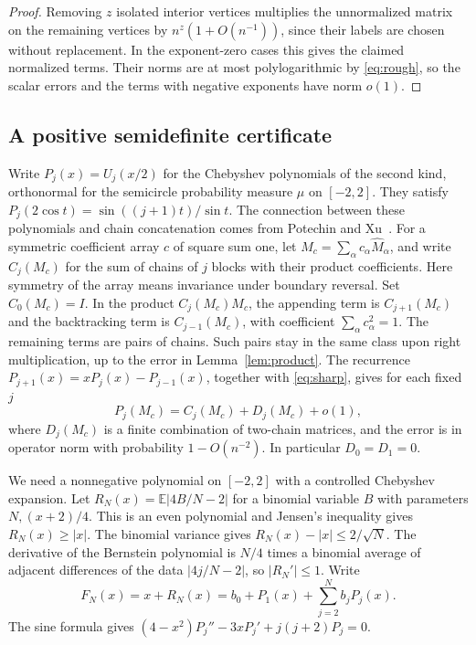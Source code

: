 \documentclass[preprints,article,submit,oneauthor]{Definitions/mdpi}
\newcommand{\E}{\mathbb E}
\newcommand{\abs}[1]{\lvert #1\rvert}
\begin{document}
\begin{proof}
Removing \(z\) isolated interior vertices multiplies the unnormalized
matrix on the remaining vertices by \(n^z(1+O(n^{-1}))\), since their
labels are chosen without replacement. In the exponent-zero cases
this gives the claimed normalized terms. Their norms are at most
polylogarithmic by \eqref{eq:rough}, so the scalar errors and the terms
with negative exponents have norm \(o(1)\).
\end{proof}

\subsection{A positive semidefinite certificate}

Write \(P_j(x)=U_j(x/2)\) for the Chebyshev polynomials of the second
kind, orthonormal for the semicircle probability measure \(\mu\) on
\([-2,2]\). They satisfy \(P_j(2\cos t)=\sin((j+1)t)/\sin t\).
The connection between these polynomials and chain concatenation
comes from Potechin and Xu~\cite{PX}.
For a symmetric coefficient array \(c\) of square sum one,
let \(M_c=\sum_\alpha c_\alpha\widehat M_\alpha\), and write \(C_j(M_c)\)
for the sum of chains of \(j\) blocks with their product coefficients.
Here symmetry of the array means invariance under boundary reversal.
Set \(C_0(M_c)=I\). In the product \(C_j(M_c)M_c\), the appending term is
\(C_{j+1}(M_c)\) and the backtracking term is \(C_{j-1}(M_c)\), with
coefficient \(\sum_\alpha c_\alpha^2=1\). The remaining terms are
pairs of chains. Such pairs stay in the same class upon right
multiplication, up to the error in Lemma~\ref{lem:product}. The
recurrence \(P_{j+1}(x)=xP_j(x)-P_{j-1}(x)\), together with
\eqref{eq:sharp}, gives for each fixed \(j\)
\begin{equation}\label{eq:cheb}
 P_j(M_c)=C_j(M_c)+D_j(M_c)+o(1),
\end{equation}
where \(D_j(M_c)\) is a finite combination of two-chain matrices, and
the error is in operator norm with probability \(1-O(n^{-2})\).
In particular \(D_0=D_1=0\).

We need a nonnegative polynomial on \([-2,2]\) with a controlled
Chebyshev expansion. Let \(R_N(x)=\E\abs{4B/N-2}\) for a binomial
variable \(B\) with parameters \(N,(x+2)/4\). This is an even
polynomial and Jensen's inequality gives \(R_N(x)\ge\abs x\).
The binomial variance gives \(R_N(x)-\abs x\le2/\sqrt N\). The
derivative of the Bernstein polynomial is \(N/4\) times a binomial
average of adjacent differences of the data \(\abs{4j/N-2}\),
so \(\abs{R_N'}\le1\). Write
\[
 F_N(x)=x+R_N(x)=b_0+P_1(x)+\sum_{j=2}^N b_jP_j(x).
\]
The sine formula gives \((4-x^2)P_j''-3xP_j'+j(j+2)P_j=0\).
\end{document}

